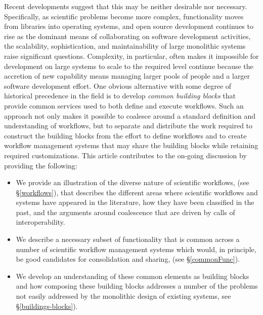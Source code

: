 Recent developments suggest that this may be neither desirable nor necessary.
Specifically, as scientific problems become more complex, functionality moves
from libraries into operating systems, and open source development continues to
rise as the dominant means of collaborating on software development activities,
the scalability, sophistication, and maintainability of large monolithic systems
raise significant questions. Complexity, in particular, often makes it
impossible for development on large systems to scale to the required level
continue because the accretion of new capability means managing larger pools of
people and a larger software development effort. One obvious alternative with
some degree of historical precedence in the field is to develop \textit{common
building blocks} that provide common services used to both define and execute
workflows. Such an approach not only makes it possible to coalesce around a
standard definition and understanding of workflows, but to separate and
distribute the work required to construct the building blocks from the effort to
define workflows and to create workflow management systems that may share the
building blocks while retaining required customizations. This article
contributes to the on-going discussion by providing the following:
\begin{itemize} \item We provide an illustration of the diverse nature of
scientific workflows, (see \S \ref{workflows}), that describes the different
areas where scientific workflows and systems have appeared in the literature,
how they have been classified in the past, and the arguments around coalescence
that are driven by calls of interoperability.  \item We describe a necessary
subset of functionality that is common across a number of scientific workflow
management systems which would, in principle, be good candidates for
consolidation and sharing, (see \S \ref{commonFunc}). \item We develop an understanding of
these common elements as building blocks and how composing these building blocks
addresses a number of the problems not easily addressed by the monolithic design
of existing systems, see \S \ref{buildings-blocks}). \end{itemize}

